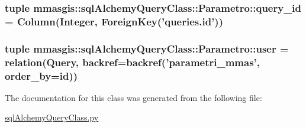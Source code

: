 \label{classmmasgis_1_1sqlAlchemyQueryClass_1_1Parametro_a331133b30c1267ce7fe6c652cda810ef}
\hypertarget{classmmasgis_1_1sqlAlchemyQueryClass_1_1Parametro_ae7ad55cbc3b1cf794e84b22dca040122}{
\subsubsection[{query\_\-id}]{\setlength{\rightskip}{0pt plus 5cm}tuple {\bf mmasgis::sqlAlchemyQueryClass::Parametro::query\_\-id} = Column(Integer, ForeignKey('queries.id'))}}
\label{classmmasgis_1_1sqlAlchemyQueryClass_1_1Parametro_ae7ad55cbc3b1cf794e84b22dca040122}
\hypertarget{classmmasgis_1_1sqlAlchemyQueryClass_1_1Parametro_abc6071696bfdd0160b1c56c68766dcb0}{
\subsubsection[{user}]{\setlength{\rightskip}{0pt plus 5cm}tuple {\bf mmasgis::sqlAlchemyQueryClass::Parametro::user} = relation({\bf Query}, backref=backref('parametri\_\-mmas', order\_\-by={\bf id}))}}
\label{classmmasgis_1_1sqlAlchemyQueryClass_1_1Parametro_abc6071696bfdd0160b1c56c68766dcb0}


The documentation for this class was generated from the following file:\begin{DoxyCompactItemize}
\item 
\hyperlink{sqlAlchemyQueryClass_8py}{sqlAlchemyQueryClass.py}\end{DoxyCompactItemize}
